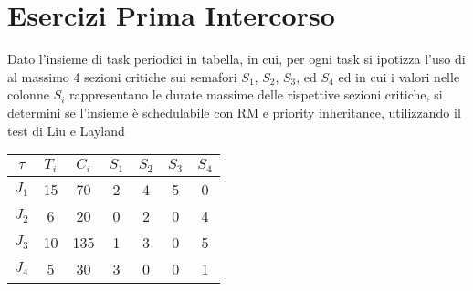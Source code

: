 \chapter{Esercizi Prima Intercorso}



\begin{Esercizio1}
Dato l'insieme di task periodici in tabella, in cui, per 
ogni task si ipotizza l'uso di al massimo 4 sezioni critiche 
sui semafori $S_1$, $S_2$, $S_3$, ed $S_4$ ed in cui i valori 
nelle colonne $S_i$ rappresentano le durate massime 
delle rispettive sezioni critiche, si determini 
se l'insieme è schedulabile con RM e priority 
inheritance, utilizzando il test di Liu e Layland

\begin{table}[h]
\centering
\begin{tabular}{|c|c|c|c|c|c|c|}
\hline
\(\tau\) & $T_i$ & $C_i$ & $S_1$ & $S_2$ & $S_3$ & $S_4$ \\
\hline
$J_1$ & 15 & 70 & 2 & 4 & 5 & 0 \\
\hline
$J_2$ & 6 & 20 & 0 & 2 & 0 & 4 \\
\hline
$J_3$ & 10 & 135 & 1 & 3 & 0 & 5 \\
\hline
$J_4$ & 5 & 30 & 3 & 0 & 0 & 1 \\
\hline
\end{tabular}
\label{tab:task_periodici}
\end{table}

\end{Esercizio1}


